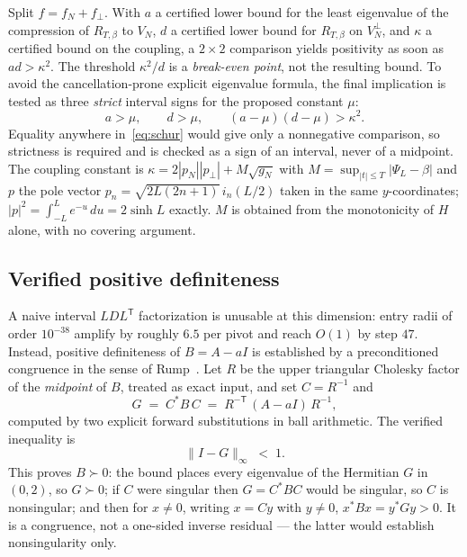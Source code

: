 \documentclass[11pt,a4paper]{article}
\theoremstyle{definition}
\theoremstyle{remark}
\newcommand{\PsiL}{\Psi_{L}}
\begin{document}
Split $f = f_N + f_{\perp}$. With $a$ a certified lower bound for the least
eigenvalue of the compression of $R_{T,\beta}$ to $V_N$, $d$ a certified lower
bound for $R_{T,\beta}$ on $V_N^{\perp}$, and $\kappa$ a certified bound on the
coupling, a $2\times2$ comparison yields positivity as soon as $ad > \kappa^2$.
The threshold $\kappa^2/d$ is a \emph{break-even point}, not the resulting
bound. To avoid the cancellation-prone explicit eigenvalue formula, the final
implication is tested as three \emph{strict} interval signs for the proposed
constant $\mu$:
\begin{equation}
\label{eq:schur}
   a > \mu , \qquad d > \mu , \qquad (a - \mu)(d - \mu) > \kappa^2 .
\end{equation}
Equality anywhere in~\eqref{eq:schur} would give only a nonnegative comparison,
so strictness is required and is checked as a sign of an interval, never of a
midpoint. The coupling constant is
$\kappa = 2|p_N||p_{\perp}| + M\sqrt{g_N}$ with
$M = \sup_{|t| \le T}|\PsiL - \beta|$ and $p$ the pole vector
$p_n = \sqrt{2L(2n+1)}\, i_n(L/2)$ taken in the same $y$-coordinates; $|p|^2 =
\int_{-L}^{L} e^{-u}\,du = 2\sinh L$ exactly. $M$ is obtained from the
monotonicity of $H$ alone, with no covering argument.

\subsection{Verified positive definiteness}

A naive interval $LDL^{\mathsf T}$ factorization is unusable at this dimension:
entry radii of order $10^{-38}$ amplify by roughly $6.5$ per pivot and reach
$O(1)$ by step $47$. Instead, positive definiteness of $B = A - aI$ is
established by a preconditioned congruence in the sense of Rump~\cite{Rump}. Let $R$ be the
upper triangular Cholesky factor of the \emph{midpoint} of $B$, treated as exact
input, and set $C = R^{-1}$ and
\[
   G \;=\; C^{*} B\, C \;=\; R^{-\mathsf T}\,(A - aI)\, R^{-1},
\]
computed by two explicit forward substitutions in ball arithmetic. The verified
inequality is
\[
   \| I - G \|_{\infty} \;<\; 1 .
\]
This proves $B \succ 0$: the bound places every eigenvalue of the Hermitian $G$
in $(0,2)$, so $G \succ 0$; if $C$ were singular then $G = C^{*}BC$ would be
singular, so $C$ is nonsingular; and then for $x \ne 0$, writing $x = Cy$ with
$y \ne 0$, $x^{*}Bx = y^{*}Gy > 0$. It is a congruence, not a one-sided inverse
residual --- the latter would establish nonsingularity only.
\end{document}
